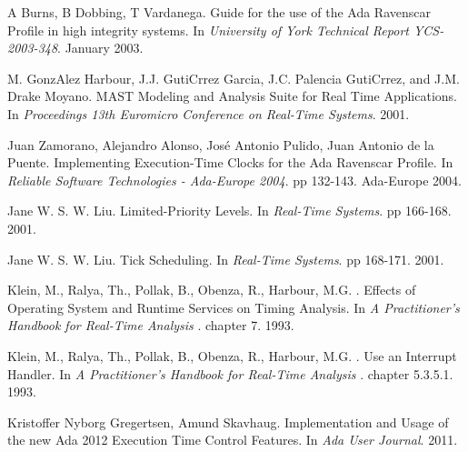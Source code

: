 \documentclass{article}
\begin{document}
\begin{thebibliography}{1}

A Burns, B Dobbing, T Vardanega.
\newblock Guide for the use of the Ada Ravenscar Profile in high integrity systems.
\newblock In {\em University of York Technical Report YCS-2003-348}. January 2003.

M. GonzAlez Harbour, J.J. GutiCrrez Garcia, J.C. Palencia GutiCrrez, and J.M. Drake Moyano.
\newblock MAST Modeling and Analysis Suite for Real Time Applications.
\newblock In {\em Proceedings 13th Euromicro Conference on Real-Time Systems}. 2001.

Juan Zamorano, Alejandro Alonso, José Antonio Pulido, Juan Antonio de la Puente.
\newblock Implementing Execution-Time Clocks for the Ada Ravenscar Profile.
\newblock In {\em Reliable Software Technologies - Ada-Europe 2004}. pp 132-143. Ada-Europe 2004.

Jane W. S. W. Liu.
\newblock Limited-Priority Levels.
\newblock In {\em Real-Time Systems}. pp 166-168. 2001.

Jane W. S. W. Liu.
\newblock Tick Scheduling.
\newblock In {\em Real-Time Systems}. pp 168-171. 2001.

Klein, M., Ralya, Th., Pollak, B., Obenza, R., Harbour, M.G. .
\newblock Effects of Operating System and Runtime Services on Timing Analysis.
\newblock In {\em A Practitioner’s Handbook for Real-Time Analysis
}. chapter 7. 1993.

Klein, M., Ralya, Th., Pollak, B., Obenza, R., Harbour, M.G. .
\newblock Use an Interrupt Handler.
\newblock In {\em A Practitioner’s Handbook for Real-Time Analysis
}. chapter 5.3.5.1. 1993.

Kristoffer Nyborg Gregertsen, Amund Skavhaug.
\newblock Implementation and Usage of the new Ada 2012 Execution Time Control Features.
\newblock In {\em Ada User Journal}. 2011.

\end{thebibliography}
\end{document}
